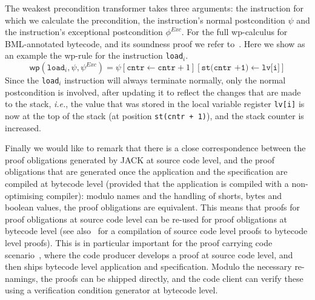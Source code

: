 The weakest precondition transformer takes three arguments: the
instruction for which we calculate the precondition, the instruction's
normal postcondition $\psi$ and the instruction's exceptional
postcondition $\phi^{\mathit{Exc}}$. For the full wp-calculus for
BML-annotated bytecode, and its soundness proof we refer
to~\cite{Pavlova:phd}. Here we show as an example the wp-rule for the
instruction \texttt{load\(_i\)}.
\[
\mathsf{wp}(\texttt{load}_i, \psi, \psi^{\mathit{Exc}})  = 
\psi[\texttt{cntr} \leftarrow \texttt{cntr} + 1][\texttt{st(cntr +1)}
\leftarrow \texttt{lv[i]}]
\]
Since the \texttt{load}\(_i\) instruction will always terminate
normally, only the normal postcondition is involved, after updating it
to reflect the changes that are made to the stack, \emph{i.e.}, the
value that was stored in the local variable register \texttt{lv[i]} is
now at the top of the stack (at position \texttt{st(cntr + 1)}),  and 
the stack counter is increased.



Finally we would like to remark that there is a close correspondence
between the proof obligations generated by JACK at source code level,
and the proof obligations that are generated once the application and
the specification are compiled at bytecode level (provided that the
application is compiled with a non-optimising compiler): modulo names
and the handling of shorts, bytes and boolean values, the proof
obligations are equivalent. This means that proofs for proof
obligations at source code level can be re-used for proof obligations
at bytecode level (see also~\cite{gta05:fast} for a compilation of
source code level proofs to bytecode level proofs). This is in
particular important for the proof carrying code
scenario~\cite{Necula97}, where the code producer develops a proof at
source code level, and then ships bytecode level application and
specification. Modulo the necessary re-namings, the proofs can be shipped 
directly, and the code client can verify these using a
verification condition generator at bytecode level.


